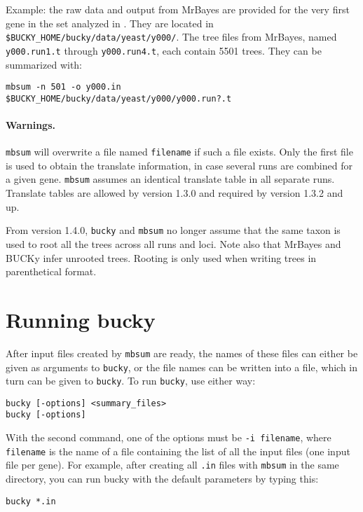 \documentclass[12pt,english,final,letterpaper]{article}
\newcommand{\bu}{BUCKy}
\begin{document}
\noindent
Example: the raw data and output from MrBayes are provided for the
very first gene in the set analyzed in \cite{ane-etal-2008}.
They are located in \verb+$BUCKY_HOME/bucky/data/yeast/y000/+. 
The tree files from MrBayes, named \verb+y000.run1.t+ through
\verb+y000.run4.t+, each contain 5501 trees. 
They can be summarized with:
\begin{verbatim}
mbsum -n 501 -o y000.in    $BUCKY_HOME/bucky/data/yeast/y000/y000.run?.t
\end{verbatim}

\paragraph{Warnings.}  
{\tt mbsum} will overwrite a file named \verb+filename+
if such a file exists.
%
Only the first file is used to obtain the translate information,
in case several runs are combined for a given gene. 
{\tt mbsum} assumes an identical translate table in all separate runs.
Translate tables are allowed by version 1.3.0 and required by version 1.3.2 and up.

From version 1.4.0, {\tt bucky} and {\tt mbsum} no longer assume 
that the same taxon is used to root all the trees across all runs and loci. 
Note also that MrBayes and \bu{} infer unrooted trees. 
Rooting is only used when writing trees in parenthetical format.

\section{Running bucky}
After input files created by {\tt mbsum} are ready, the names of these
files can either be given as arguments to {\tt bucky}, or the file 
names can be written into a file, which in turn can be given to
{\tt bucky}. To run {\tt bucky}, use either way:
\begin{verbatim}
bucky [-options] <summary_files> 
bucky [-options]
\end{verbatim}
With the second command, one of the options must be 
{\tt -i filename}, where {\tt filename} is the name of a file
containing the list of all the input files (one input file per gene).
For example, after creating all {\tt .in} files with {\tt mbsum} in the same 
directory, you can run bucky with the default parameters by typing this:
\begin{verbatim}
bucky *.in
\end{verbatim}
\end{document}
